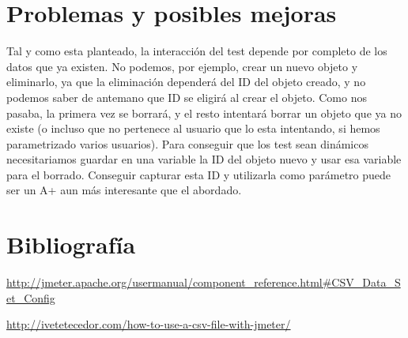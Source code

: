 \documentclass[a4paper]{article}
\begin{document}
\section{Problemas y posibles mejoras}

Tal y como esta planteado, la interacción del test depende por completo de los datos que ya existen. No podemos, por ejemplo, crear un nuevo objeto y eliminarlo, ya que la eliminación dependerá del ID del objeto creado, y no podemos saber de antemano que ID se eligirá al crear el objeto. Como nos pasaba, la primera vez se borrará, y el resto intentará borrar un objeto que ya no existe (o incluso que no pertenece al usuario que lo esta intentando, si hemos parametrizado varios usuarios). Para conseguir que los test sean dinámicos necesitariamos guardar en una variable la ID del objeto nuevo y usar esa variable para el borrado. Conseguir capturar esta ID y utilizarla como parámetro puede ser un A+ aun más interesante que el abordado.

\section{Bibliografía}
\url{http://jmeter.apache.org/usermanual/component_reference.html#CSV_Data_Set_Config}

\url{http://ivetetecedor.com/how-to-use-a-csv-file-with-jmeter/}
\end{document}
